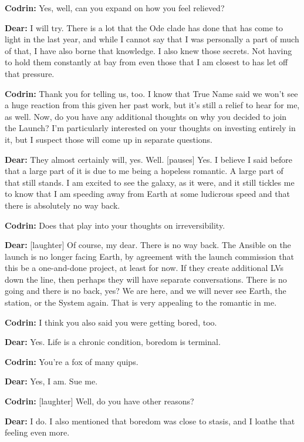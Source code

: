 \textbf{Codrin:} Yes, well, can you expand on how you feel relieved?

\textbf{Dear:} I will try. There is a lot that the Ode clade has done that has come to light in the last year, and while I cannot say that I was personally a part of much of that, I have also borne that knowledge. I also knew those secrets. Not having to hold them constantly at bay from even those that I am closest to has let off that pressure.

\textbf{Codrin:} Thank you for telling us, too. I know that True Name said we won't see a huge reaction from this given her past work, but it's still a relief to hear for me, as well. Now, do you have any additional thoughts on why you decided to join the Launch? I'm particularly interested on your thoughts on investing entirely in it, but I suspect those will come up in separate questions.

\textbf{Dear:} They almost certainly will, yes. Well. {[}pauses{]} Yes. I believe I said before that a large part of it is due to me being a hopeless romantic. A large part of that still stands. I am excited to see the galaxy, as it were, and it still tickles me to know that I am speeding away from Earth at some ludicrous speed and that there is absolutely no way back.

\textbf{Codrin:} Does that play into your thoughts on irreversibility.

\textbf{Dear:} {[}laughter{]} Of course, my dear. There is no way back. The Ansible on the launch is no longer facing Earth, by agreement with the launch commission that this be a one-and-done project, at least for now. If they create additional LVs down the line, then perhaps they will have separate conversations. There is no going and there is no back, yes? We are here, and we will never see Earth, the station, or the System again. That is very appealing to the romantic in me.

\textbf{Codrin:} I think you also said you were getting bored, too.

\textbf{Dear:} Yes. Life is a chronic condition, boredom is terminal.

\textbf{Codrin:} You're a fox of many quips.

\textbf{Dear:} Yes, I am. Sue me.

\textbf{Codrin:} {[}laughter{]} Well, do you have other reasons?

\textbf{Dear:} I do. I also mentioned that boredom was close to stasis, and I loathe that feeling even more.

